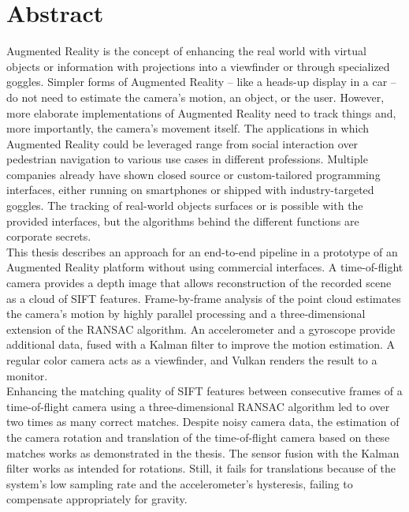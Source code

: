 
\chapter*{Abstract}
\label{sec:Abstract}
Augmented Reality is the concept of enhancing the real world with virtual objects or information with projections into a viewfinder or through specialized goggles. Simpler forms of Augmented Reality – like a heads-up display in a car – do not need to estimate the camera's motion, an object, or the user.  However, more elaborate implementations of Augmented Reality need to track things and, more importantly, the camera's movement itself. The applications in which Augmented Reality could be leveraged range from social interaction over pedestrian navigation to various use cases in different professions. Multiple companies already have shown closed source or custom-tailored programming interfaces, either running on smartphones or shipped with industry-targeted goggles. The tracking of real-world objects surfaces or is possible with the provided interfaces, but the algorithms behind the different functions are corporate secrets.\\ 
This thesis describes an approach for an end-to-end pipeline in a prototype of an Augmented Reality platform without using commercial interfaces. A time-of-flight camera provides a depth image that allows reconstruction of the recorded scene as a cloud of SIFT features. Frame-by-frame analysis of the point cloud estimates the camera's motion by highly parallel processing and a three-dimensional extension of the RANSAC algorithm. An accelerometer and a gyroscope provide additional data, fused with a Kalman filter to improve the motion estimation. A regular color camera acts as a viewfinder, and Vulkan renders the result to a monitor.\\
Enhancing the matching quality of SIFT features between consecutive frames of a time-of-flight camera using a three-dimensional RANSAC algorithm led to over two times as many correct matches. Despite noisy camera data, the estimation of the camera rotation and translation of the time-of-flight camera based on these matches works as demonstrated in the thesis. The sensor fusion with the Kalman filter works as intended for rotations. Still, it fails for translations because of the system's low sampling rate and the accelerometer's hysteresis, failing to compensate appropriately for gravity.

